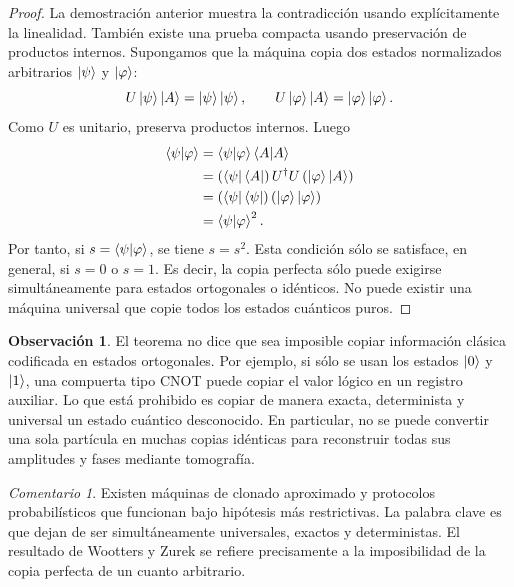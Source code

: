 \documentclass[12pt,a4paper]{article}
\theoremstyle{definition}
\newtheorem{observacion}[definicion]{Observación}
\theoremstyle{plain}
\theoremstyle{remark}
\newtheorem*{comentario}{Comentario}
\begin{document}
\begin{proof}
La demostración anterior muestra la contradicción usando explícitamente la linealidad. También existe una prueba compacta usando preservación de productos internos. Supongamos que la máquina copia dos estados normalizados arbitrarios $\ket{\psi}$ y $\ket{\varphi}$:
\begin{equation*}
    U\ket{\psi}\ket{A}=\ket{\psi}\ket{\psi},
    \qquad
    U\ket{\varphi}\ket{A}=\ket{\varphi}\ket{\varphi}.
\end{equation*}
Como $U$ es unitario, preserva productos internos. Luego
\begin{align*}
    \braket{\psi|\varphi}
    &=\braket{\psi|\varphi}\braket{A|A}\\
    &=\left(\bra{\psi}\bra{A}\right)U^\dagger U\left(\ket{\varphi}\ket{A}\right)\\
    &=\left(\bra{\psi}\bra{\psi}\right)\left(\ket{\varphi}\ket{\varphi}\right)\\
    &=\braket{\psi|\varphi}^2.
\end{align*}
Por tanto, si $s=\braket{\psi|\varphi}$, se tiene $s=s^2$. Esta condición sólo se satisface, en general, si $s=0$ o $s=1$. Es decir, la copia perfecta sólo puede exigirse simultáneamente para estados ortogonales o idénticos. No puede existir una máquina universal que copie todos los estados cuánticos puros.
\end{proof}

\begin{observacion}
El teorema no dice que sea imposible copiar información clásica codificada en estados ortogonales. Por ejemplo, si sólo se usan los estados $\ket{0}$ y $\ket{1}$, una compuerta tipo CNOT puede copiar el valor lógico en un registro auxiliar. Lo que está prohibido es copiar de manera exacta, determinista y universal un estado cuántico desconocido. En particular, no se puede convertir una sola partícula en muchas copias idénticas para reconstruir todas sus amplitudes y fases mediante tomografía.
\end{observacion}

\begin{comentario}
Existen máquinas de clonado aproximado y protocolos probabilísticos que funcionan bajo hipótesis más restrictivas. La palabra clave es que dejan de ser simultáneamente universales, exactos y deterministas. El resultado de Wootters y Zurek se refiere precisamente a la imposibilidad de la copia perfecta de un cuanto arbitrario.
\end{comentario}
\end{document}
